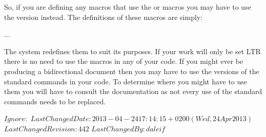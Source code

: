     So, if you are defining any macros that use the  or
 macros you may have to use the  version
instead. The  definitions of these macros are simply:
\begin{lcode}
\newcommand*{\memRTLleftskip}{\leftskip}
\newcommand*{\memRTLrightskip}{\rightskip}
...
\newcommand*{\memRTLraggedleft}{\raggedleft}
\end{lcode}
The  system redefines them to suit its purposes. If your
work will only be set LTR there is no need to use the 
macros in any of your code. If you might ever be producing a bidirectional
document then you may have to use the  versions of the standard
commands in your code. To determine where you might have to use them
you will have to consult the  documentation as not every use
of the standard commands needs to be replaced. 





\svnidlong
{$Ignore: $}
{$LastChangedDate: 2013-04-24 17:14:15 +0200 (Wed, 24 Apr 2013) $}
{$LastChangedRevision: 442 $}
{$LastChangedBy: daleif $}



\clearpage

\makeatletter
\begin{comment}
\makechapterstyle{bringhurst}{%
  \renewcommand{\chapterheadstart}{}
  \renewcommand{\printchaptername}{}
  \renewcommand{\chapternamenum}{}
  \renewcommand{\printchapternum}{}
  \renewcommand{\afterchapternum}{}
  \renewcommand{\printchaptertitle}[1]{%
    \raggedright\Large\scshape\MakeLowercase{##1}}
  \renewcommand{\afterchaptertitle}{%
    \vskip\onelineskip \hrule\vskip\onelineskip}
}
\end{comment}

\setsecheadstyle{\raggedright\scshape\MakeLowercase}
  \setbeforesecskip{-\onelineskip}
  \setaftersecskip{\onelineskip}

  \setbeforesubsecskip{-\onelineskip}
  \setaftersubsecskip{\onelineskip}

